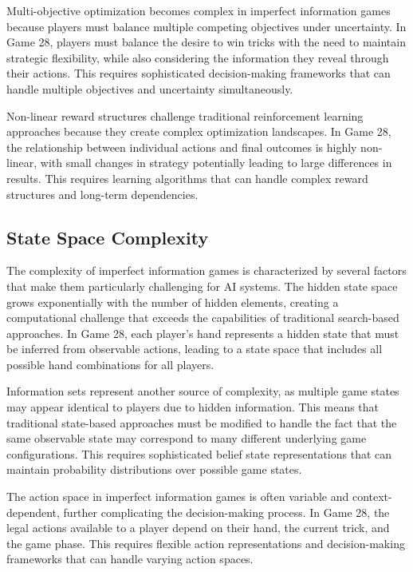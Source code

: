 \documentclass[conference]{IEEEtran}
\begin{document}
Multi-objective optimization becomes complex in imperfect information games because players must balance multiple competing objectives under uncertainty. In Game 28, players must balance the desire to win tricks with the need to maintain strategic flexibility, while also considering the information they reveal through their actions. This requires sophisticated decision-making frameworks that can handle multiple objectives and uncertainty simultaneously.

Non-linear reward structures challenge traditional reinforcement learning approaches because they create complex optimization landscapes. In Game 28, the relationship between individual actions and final outcomes is highly non-linear, with small changes in strategy potentially leading to large differences in results. This requires learning algorithms that can handle complex reward structures and long-term dependencies.

\subsection{State Space Complexity}

The complexity of imperfect information games is characterized by several factors that make them particularly challenging for AI systems. The hidden state space grows exponentially with the number of hidden elements, creating a computational challenge that exceeds the capabilities of traditional search-based approaches. In Game 28, each player's hand represents a hidden state that must be inferred from observable actions, leading to a state space that includes all possible hand combinations for all players.

Information sets represent another source of complexity, as multiple game states may appear identical to players due to hidden information. This means that traditional state-based approaches must be modified to handle the fact that the same observable state may correspond to many different underlying game configurations. This requires sophisticated belief state representations that can maintain probability distributions over possible game states.

The action space in imperfect information games is often variable and context-dependent, further complicating the decision-making process. In Game 28, the legal actions available to a player depend on their hand, the current trick, and the game phase. This requires flexible action representations and decision-making frameworks that can handle varying action spaces.
\end{document}
